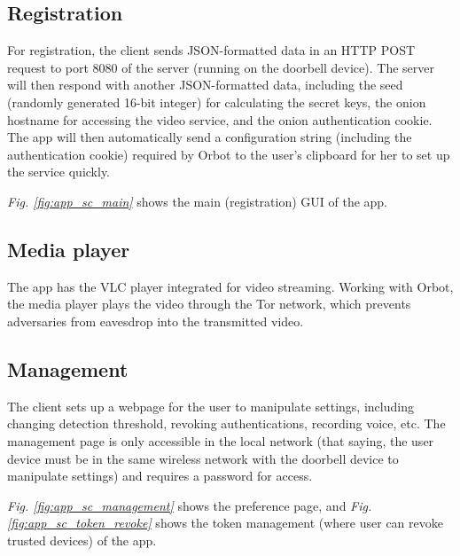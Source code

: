 \subsection{Registration} For registration, the client sends JSON-formatted data in an HTTP POST request to port 8080 of the server (running on the doorbell device). The server will then respond with another JSON-formatted data, including the seed (randomly generated 16-bit integer) for calculating the secret keys, the onion hostname for accessing the video service, and the onion authentication cookie. The app will then automatically send a configuration string (including the authentication cookie) required by Orbot to the user’s clipboard for her to set up the service quickly. 

\textit{Fig. \ref{fig:app_sc_main}} shows the main (registration) GUI of the app.


\subsection{Media player} The app has the VLC player integrated for video streaming. Working with Orbot, the media player plays the video through the Tor network, which prevents adversaries from eavesdrop into the transmitted video.

\subsection{Management} The client sets up a webpage for the user to manipulate settings, including changing detection threshold, revoking authentications, recording voice, etc. The management page is only accessible in the local network (that saying, the user device must be in the same wireless network with the doorbell device to manipulate settings) and requires a password for access.

\textit{Fig. \ref{fig:app_sc_management}} shows the preference page, and \textit{Fig. \ref{fig:app_sc_token_revoke}} shows the token management (where user can revoke trusted devices) of the app.

